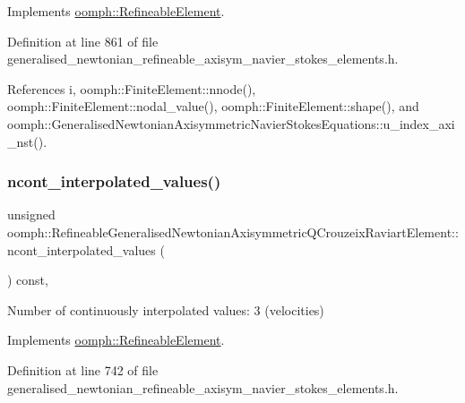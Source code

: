 Implements \hyperlink{classoomph_1_1RefineableElement_ada6f0efe831ffefb1d2829ce01d45bfc}{oomph\+::\+Refineable\+Element}.



Definition at line 861 of file generalised\+\_\+newtonian\+\_\+refineable\+\_\+axisym\+\_\+navier\+\_\+stokes\+\_\+elements.\+h.



References i, oomph\+::\+Finite\+Element\+::nnode(), oomph\+::\+Finite\+Element\+::nodal\+\_\+value(), oomph\+::\+Finite\+Element\+::shape(), and oomph\+::\+Generalised\+Newtonian\+Axisymmetric\+Navier\+Stokes\+Equations\+::u\+\_\+index\+\_\+axi\+\_\+nst().

\mbox{\label{classoomph_1_1RefineableGeneralisedNewtonianAxisymmetricQCrouzeixRaviartElement_a774dcb42390e7e3cf14a33c41cd957c3}} 
\subsubsection{\texorpdfstring{ncont\+\_\+interpolated\+\_\+values()}{ncont\_interpolated\_values()}}
{\footnotesize\ttfamily unsigned oomph\+::\+Refineable\+Generalised\+Newtonian\+Axisymmetric\+Q\+Crouzeix\+Raviart\+Element\+::ncont\+\_\+interpolated\+\_\+values (\begin{DoxyParamCaption}{ }\end{DoxyParamCaption}) const\hspace{0.3cm}{\ttfamily [inline]}, {\ttfamily [virtual]}}



Number of continuously interpolated values\+: 3 (velocities) 



Implements \hyperlink{classoomph_1_1RefineableElement_a53e171a18c9f43f1db90a6876516a073}{oomph\+::\+Refineable\+Element}.



Definition at line 742 of file generalised\+\_\+newtonian\+\_\+refineable\+\_\+axisym\+\_\+navier\+\_\+stokes\+\_\+elements.\+h.

